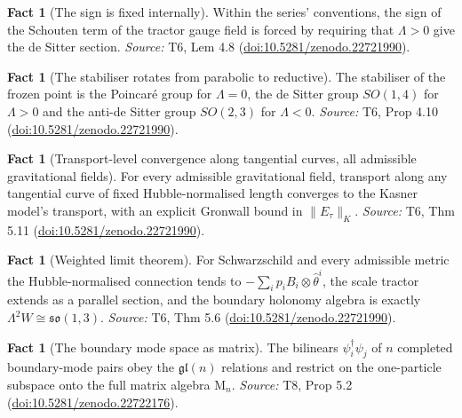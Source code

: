 \documentclass[11pt]{article}
\theoremstyle{definition}
\newtheorem{fact}[theorem]{Fact}
\theoremstyle{plain}
\providecommand{\Mat}{}\renewcommand{\Mat}{\mathrm{M}}
\begin{document}
\begin{fact}[The sign is fixed internally]\label{c:interior.sign-fixed-internally}
Within the series' conventions, the sign of the Schouten term of the tractor gauge field is forced by requiring that $\Lambda > 0$ give the de Sitter section.
\emph{Source:} T6, Lem 4.8 (\href{https://doi.org/10.5281/zenodo.22721990}{doi:10.5281/zenodo.22721990}).
\end{fact}

\begin{fact}[The stabiliser rotates from parabolic to reductive]\label{c:interior.stabiliser-rotates-parabolic-reductive}
The stabiliser of the frozen point is the Poincar\'e group for $\Lambda = 0$, the de Sitter group $SO(1,4)$ for $\Lambda > 0$ and the anti-de Sitter group $SO(2,3)$ for $\Lambda < 0$.
\emph{Source:} T6, Prop 4.10 (\href{https://doi.org/10.5281/zenodo.22721990}{doi:10.5281/zenodo.22721990}).
\end{fact}

\begin{fact}[Transport-level convergence along tangential curves, all admissible gravitational fields]\label{c:interior.transport-level-convergence-along-tangential-curves}
For every admissible gravitational field, transport along any tangential curve of fixed Hubble-normalised length converges to the Kasner model's transport, with an explicit Gronwall bound in $\|E_\tau\|_K$.
\emph{Source:} T6, Thm 5.11 (\href{https://doi.org/10.5281/zenodo.22721990}{doi:10.5281/zenodo.22721990}).
\end{fact}

\begin{fact}[Weighted limit theorem]\label{c:interior.weighted-limit-theorem}
For Schwarzschild and every admissible metric the Hubble-normalised connection tends to $-\sum_i p_i B_i \otimes \hat\theta^i$, the scale tractor extends as a parallel section, and the boundary holonomy algebra is exactly $\Lambda^2 W \cong \mathfrak{so}(1,3)$.
\emph{Source:} T6, Thm 5.6 (\href{https://doi.org/10.5281/zenodo.22721990}{doi:10.5281/zenodo.22721990}).
\end{fact}

\begin{fact}[The boundary mode space as matrix]\label{c:scrambling.boundary-mode-space-matrix}
The bilinears $\psi_i^\dagger\psi_j$ of $n$ completed boundary-mode pairs obey the $\mathfrak{gl}(n)$ relations and restrict on the one-particle subspace onto the full matrix algebra $\Mat_n$.
\emph{Source:} T8, Prop 5.2 (\href{https://doi.org/10.5281/zenodo.22722176}{doi:10.5281/zenodo.22722176}).
\end{fact}
\end{document}
